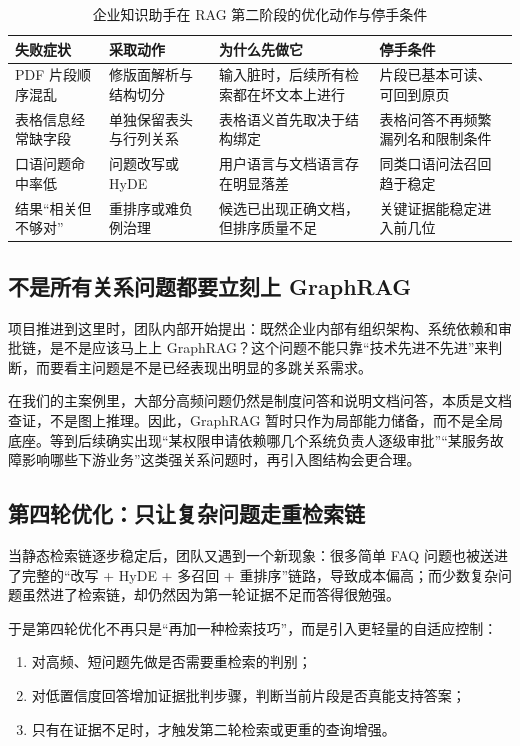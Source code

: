 \begin{table}[H]
\centering
\small
\begin{tabularx}{\textwidth}{>{\raggedright\arraybackslash}p{2.6cm}>{\raggedright\arraybackslash}p{3cm}>{\raggedright\arraybackslash}p{2.9cm}>{\raggedright\arraybackslash}X}
\toprule
\textbf{失败症状} & \textbf{采取动作} & \textbf{为什么先做它} & \textbf{停手条件} \\
\midrule
PDF 片段顺序混乱 & 修版面解析与结构切分 & 输入脏时，后续所有检索都在坏文本上进行 & 片段已基本可读、可回到原页 \\
表格信息经常缺字段 & 单独保留表头与行列关系 & 表格语义首先取决于结构绑定 & 表格问答不再频繁漏列名和限制条件 \\
口语问题命中率低 & 问题改写或 HyDE & 用户语言与文档语言存在明显落差 & 同类口语问法召回趋于稳定 \\
结果“相关但不够对” & 重排序或难负例治理 & 候选已出现正确文档，但排序质量不足 & 关键证据能稳定进入前几位 \\
\bottomrule
\end{tabularx}
\caption{企业知识助手在 RAG 第二阶段的优化动作与停手条件}
\label{tab:rag-optimization-actions}
\end{table}

\subsection{不是所有关系问题都要立刻上 GraphRAG}
项目推进到这里时，团队内部开始提出：既然企业内部有组织架构、系统依赖和审批链，是不是应该马上上 GraphRAG？这个问题不能只靠“技术先进不先进”来判断，而要看主问题是不是已经表现出明显的多跳关系需求。

在我们的主案例里，大部分高频问题仍然是制度问答和说明文档问答，本质是文档查证，不是图上推理。因此，GraphRAG 暂时只作为局部能力储备，而不是全局底座。等到后续确实出现“某权限申请依赖哪几个系统负责人逐级审批”“某服务故障影响哪些下游业务”这类强关系问题时，再引入图结构会更合理。

\subsection{第四轮优化：只让复杂问题走重检索链}
当静态检索链逐步稳定后，团队又遇到一个新现象：很多简单 FAQ 问题也被送进了完整的“改写 + HyDE + 多召回 + 重排序”链路，导致成本偏高；而少数复杂问题虽然进了检索链，却仍然因为第一轮证据不足而答得很勉强。

于是第四轮优化不再只是“再加一种检索技巧”，而是引入更轻量的自适应控制：
\begin{enumerate}
  \item 对高频、短问题先做是否需要重检索的判别；
  \item 对低置信度回答增加证据批判步骤，判断当前片段是否真能支持答案；
  \item 只有在证据不足时，才触发第二轮检索或更重的查询增强。
\end{enumerate}

